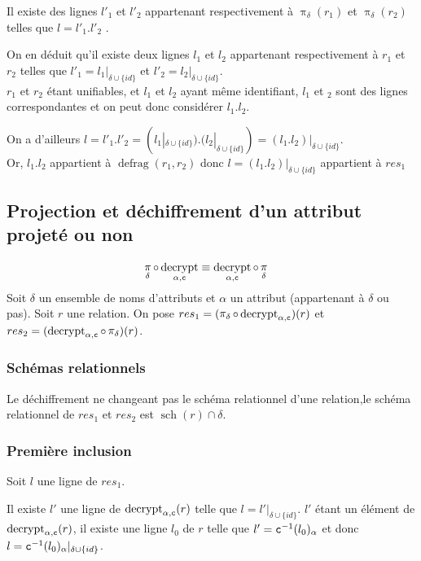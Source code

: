 \documentclass[french]{article}
\DeclareMathOperator{\proj}{\pi}
\DeclareMathOperator{\defrag}{defrag}
\DeclareMathOperator{\decrypt}{decrypt}
\DeclareMathOperator{\s}{sch}
\newcommand\typeT[1]{\text{\ttfamily #1}}
\newcommand{\decryptArgs}[2]{\decrypt_{#1 , \typeT{#2}}}
\newcommand{\projDelta}{\proj_{\delta}}
\newcommand{\decryptCAlpha}{\decryptArgs{\alpha}{c}}
\newcommand{\dc}[1]{\typeT{c}^{-1}(#1)}
\newcommand{\cip}{\cup \{id\}}
\newcommand{\intro}[2]{Soit $r$ une relation. On pose $res_1 = (#1)(r) $ et $res_2 = (#2)(r) $}
\begin{document}
Il existe des lignes $l'_1$ et $l'_2$
appartenant respectivement à $\projDelta(r_1)$ et $\projDelta(r_2)$
telles que $l = l'_1 . l'_2$
.

On en déduit qu'il existe deux lignes $l_1$ et $l_2$
appartenant respectivement à $r_1$ et $r_2$ 
telles que $l'_1 = l_1|_{\delta \cip}$ et $l'_2 = l_2|_{\delta \cip}$. \\

$r_1$ et $r_2$ étant unifiables, et $l_1$ et $l_2$ ayant même identifiant,
$l_1$ et $_2$ sont des lignes correspondantes et on peut donc considérer
$l_1 . l_2$.

On a d'ailleurs 
$l = l'_1 . l'_2 = (l_1|_{\delta \cip}) . (l_2|_{\delta \cip}) = (l_1 . l_2)|_{\delta \cip}$. \\

Or, $l_1 . l_2$ appartient à $\defrag(r_1, r_2)$
donc $l = (l_1 . l_2)|_{\delta \cip}$ appartient à $ {res}_1$

\subsection*{Projection et déchiffrement d'un attribut projeté ou non}
\begin{align}
\projDelta \circ \decryptArgs{\alpha}{c}
& \equiv \decryptArgs{\alpha}{c} \circ \projDelta
\end{align}
Soit $\delta$ un ensemble de noms d'attributs
et $\alpha$ un attribut (appartenant à $\delta$ ou pas).
\intro{\projDelta \circ \decryptArgs{\alpha}{c}}{\decryptArgs{\alpha}{c} \circ \projDelta}.

\subsubsection*{Schémas relationnels}
Le déchiffrement ne changeant pas le schéma relationnel
d'une relation,le schéma relationnel de $res_1$ et $res_2$
est $\s(r) \cap \delta$.

\subsubsection*{Première inclusion}
Soit $l$ une ligne de $res_1$.

Il existe $l'$ une ligne de $\decryptCAlpha(r)$ telle que
$l = l'|_{\delta \cip}$.
$l'$ étant un élément de $\decryptCAlpha(r)$, il existe une ligne
$l_0$ de $r$ telle que $l' = \dc{l_0}_\alpha$
et donc $l = \dc{l_0}_\alpha|_{\delta \cip}$. \\
\end{document}
